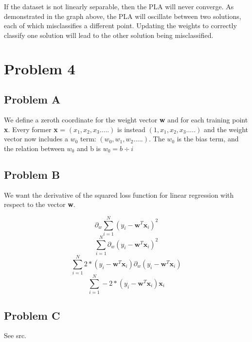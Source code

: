 \documentclass[12pt]{article} %
\begin{document}
If the dataset is not linearly separable, then the PLA will never converge. As demonstrated in the graph above, the PLA will oscillate between two solutions, each of which misclassifies a different point. Updating the weights to correctly classify one solution will lead to the other solution being misclassified.

\section{Problem 4}
\subsection{Problem A}
We define a zeroth coordinate for the weight vector \textbf{w} and for each training point \textbf{x}. Every former \textbf{x} = $(x_1, x_2, x_3.....)$ is instead $(1, x_1, x_2, x_3.....)$ and the weight vector now includes a $w_0$ term: $(w_0, w_1, w_2.....)$. The $w_0$ is the bias term, and the relation between $w_0$ and b is $w_0 = b \div i$

\subsection{Problem B}
We want the derivative of the squared loss function for linear regression with respect to the vector \textbf{w}.

$$\partial _w \sum_{i = 1}^{N} (y_i - \textbf{w}^T\textbf{x}_i)^2$$
$$\sum_{i = 1}^{N} \partial _w (y_i - \textbf{w}^T\textbf{x}_i)^2$$
$$\sum_{i = 1}^{N} 2 * (y_i - \textbf{w}^T\textbf{x}_i) \partial _w (y_i - \textbf{w}^T\textbf{x}_i)$$
$$\sum_{i = 1}^{N} -2 * (y_i - \textbf{w}^T\textbf{x}_i) \textbf{x}_i$$

\subsection{Problem C}
See src.
\end{document}
